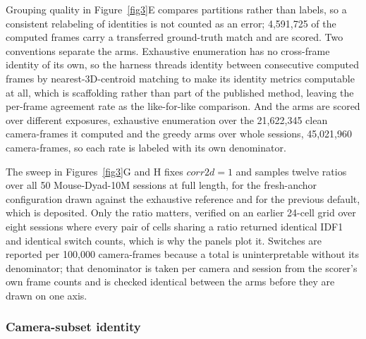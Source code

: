 \documentclass[pdflatex, sn-nature]{sn-jnl}
\theoremstyle{thmstyleone}%
\theoremstyle{thmstyletwo}%
\theoremstyle{thmstylethree}%
\begin{document}
Grouping quality in Figure~\ref{fig3}E compares partitions rather than labels, so a consistent relabeling of identities is not counted as an error; 4,591,725 of the computed frames carry a transferred ground-truth match and are scored. Two conventions separate the arms. Exhaustive enumeration has no cross-frame identity of its own, so the harness threads identity between consecutive computed frames by nearest-3D-centroid matching to make its identity metrics computable at all, which is scaffolding rather than part of the published method, leaving the per-frame agreement rate as the like-for-like comparison. And the arms are scored over different exposures, exhaustive enumeration over the 21,622,345 clean camera-frames it computed and the greedy arms over whole sessions, 45,021,960 camera-frames, so each rate is labeled with its own denominator.

The sweep in Figures~\ref{fig3}G and H fixes $corr2d = 1$ and samples twelve ratios over all 50 Mouse-Dyad-10M sessions at full length, for the fresh-anchor configuration drawn against the exhaustive reference and for the previous default, which is deposited. Only the ratio matters, verified on an earlier 24-cell grid over eight sessions where every pair of cells sharing a ratio returned identical IDF1 and identical switch counts, which is why the panels plot it. Switches are reported per 100,000 camera-frames because a total is uninterpretable without its denominator; that denominator is taken per camera and session from the scorer's own frame counts and is checked identical between the arms before they are drawn on one axis.

\subsubsection{Camera-subset identity}\label{methods-subset}
\end{document}
